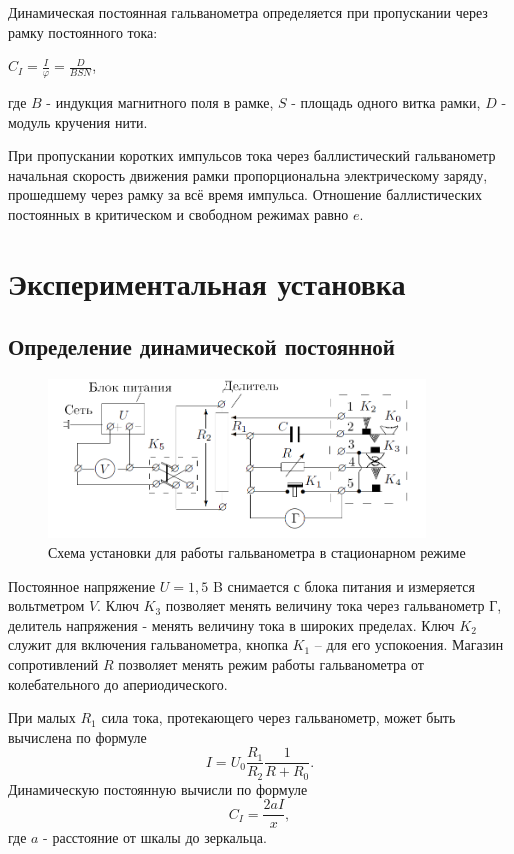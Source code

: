 \documentclass[a4paper,12pt]{article}
\begin{document}
  Динамическая постоянная гальванометра определяется при пропускании через рамку постоянного тока:
  \begin{center}
      $C_I = \frac{I}{\varphi} = \frac{D}{BSN}$,
  \end{center}
  где $B$ - индукция магнитного поля в рамке, $S$ - площадь одного витка рамки, $D$ - модуль кручения нити. \par
  При пропускании коротких импульсов тока через баллистический гальванометр начальная скорость движения рамки пропорциональна электрическому заряду, прошедшему через рамку за всё время импульса. Отношение баллистических постоянных в критическом и свободном режимах равно $e$.

\section{Экспериментальная установка}

  \subsection{Определение динамической постоянной}
    \begin{figure}[h]
        \centering
        \includegraphics[width=10cm]{fig1.PNG}
        \caption{Схема установки для работы гальванометра в стационарном режиме}
        \label{fig:stationary}
    \end{figure}
    Постоянное напряжение $U = 1,5$ B снимается с блока питания и измеряется вольтметром $V$. Ключ $K_3$ позволяет менять величину тока через гальванометр Г, делитель напряжения - менять величину тока в широких пределах. Ключ $K_2$ служит для включения гальванометра, кнопка $K_1$ -- для его успокоения. Магазин сопротивлений $R$ позволяет менять режим работы гальванометра от колебательного до апериодического. \par
    При малых $R_1$ сила тока, протекающего через гальванометр, может быть вычислена по формуле
    \begin{equation}
        I = U_0 \frac{R_1}{R_2} \frac{1}{R + R_0}.
        \label{eq:curr}
    \end{equation}
    Динамическую постоянную вычисли по формуле
    \begin{equation}
        C_I = \frac{2aI}{x},
        \label{eq:ci}
    \end{equation}
    где $a$ - расстояние от шкалы до зеркальца.
\end{document}
